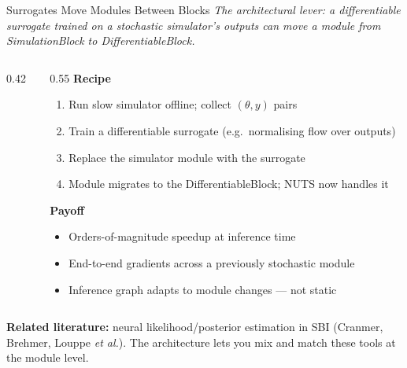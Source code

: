 \documentclass[aspectratio=169]{beamer}
\begin{document}
\begin{frame}[noframenumbering]{Surrogates Move Modules Between Blocks}
	\footnotesize
	\textit{The architectural lever: a differentiable surrogate trained on a stochastic simulator's outputs can move a module from SimulationBlock to DifferentiableBlock.}

	\bigskip
	\begin{columns}[T]
		\begin{column}{0.42\textwidth}
			\centering
		\end{column}
		\begin{column}{0.55\textwidth}
			\textbf{Recipe}
			\begin{enumerate}\itemsep3pt\parskip0pt
				\item Run slow simulator offline; collect $(\theta, y)$ pairs
				\item Train a differentiable surrogate (e.g.\ normalising flow over outputs)
				\item Replace the simulator module with the surrogate
				\item Module migrates to the DifferentiableBlock; NUTS now handles it
			\end{enumerate}

			\medskip
			\textbf{Payoff}
			\begin{itemize}\itemsep3pt\parskip0pt
				\item Orders-of-magnitude speedup at inference time
				\item End-to-end gradients across a previously stochastic module
				\item Inference graph adapts to module changes --- not static
			\end{itemize}
		\end{column}
	\end{columns}

	\bigskip
	\centering
	{\scriptsize\textbf{Related literature:} neural likelihood/posterior estimation in SBI (Cranmer, Brehmer, Louppe \emph{et al.}). The architecture lets you mix and match these tools at the module level.}
\end{frame}
\end{document}
